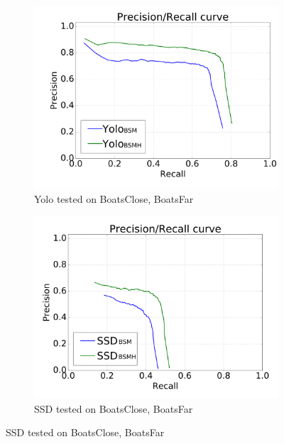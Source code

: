 \begin{figure}[h!]
\begin{subfigure}{.5\textwidth}
  \centering
  \includegraphics[width=0.8\linewidth]{results/case_buildings/prec_recall/yolo/bcbf-eps.png}
  \caption{Yolo tested on BoatsClose, BoatsFar}
  \label{fig:sfig1}
\end{subfigure}%
\begin{subfigure}{.5\textwidth}
  \centering
  \includegraphics[width=.8\linewidth]{results/case_buildings/prec_recall/ssd/bcbf-eps.png}
  \caption{SSD tested on BoatsClose, BoatsFar}
  \label{fig:sfig2}
\end{subfigure}


\end{figure}
